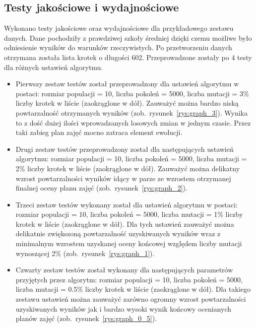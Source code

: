 	\subsection{Testy jakościowe i wydajnościowe}
	Wykonano testy jakościowe oraz wydajnościowe dla przykładowego zestawu danych. Dane pochodziły z prawdziwej szkoły średniej dzięki czemu możliwe było odniesienie wyników do warunków rzeczywistych. Po przetworzeniu danych otrzymana została lista krotek o długości 602. Przeprowadzone zostały po 4 testy dla różnych ustawień algorytmu. 
\begin{itemize}
	\item Pierwszy zestaw testów został przeprowadzony dla ustawień algorytmu w postaci: rozmiar populacji = 10, liczba pokoleń = 5000, liczba mutacji = 3\% liczby krotek w liście (zaokrąglone w dół). Zauważyć można bardzo niską powtarzalność otrzymanych wyników (zob.~rysunek~\ref{rys:graph_3}). Wynika to z dość dużej ilości wprowadzanych losowych zmian w jednym czasie. Przez taki zabieg plan zajęć mocno zatraca element ewolucji. 
	\newpage
	\item Drugi zestaw testów przeprowadzony został dla następujących ustawień algorytmu: rozmiar populacji = 10, liczba pokoleń = 5000, liczba mutacji = 2\% liczby krotek w liście (zaokrąglone w dół). Zauważyć można delikatny wzrost powtarzalności wyników idący w parze ze wzrostem otrzymanej finalnej oceny planu zajęć (zob.~rysunek~\ref{rys:graph_2}). 
	\item Trzeci zestaw testów wykonany został dla ustawień algorytmu w postaci: rozmiar populacji = 10, liczba pokoleń = 5000, liczba mutacji = 1\% liczby krotek w liście (zaokrąglone w dół). Dla tych ustawień zauważyć można delikatnie zwiększoną powtarzalność uzyskiwanych wyników wraz z minimalnym wzrostem uzyskanej oceny końcowej względem liczby mutacji wynoszącej 2\% (zob.~rysunek~\ref{rys:graph_1}). 
	\item Czwarty zestaw testów został wykonany dla następujących parametrów przyjętych przez algorytm:  rozmiar populacji = 10, liczba pokoleń = 5000, liczba mutacji = 0.5\% liczby krotek w liście (zaokrąglone w dół). Dla takiego zestawu ustawień można zauważyć zarówno ogromny wzrost powtarzalności uzyskiwanych wyników jak i bardzo wysoki wynik końcowy ocenianych planów zajęć (zob.~rysunek~\ref{rys:graph_0_5}). 
\end{itemize}
	
